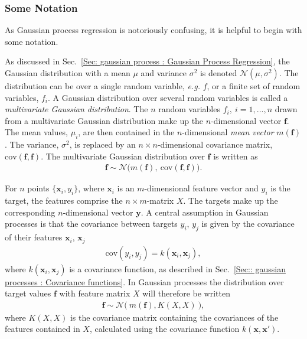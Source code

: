 \documentclass[twoside,english]{uiofysmaster}
\begin{document}
\subsubsection{Some Notation}

As Gaussian process regression is notoriously confusing, it is helpful to begin with some notation. 

As discussed in Sec.~\ref{Sec: gaussian process : Gaussian Process Regression}, the Gaussian distribution with a mean $\mu$ and variance $\sigma^2$ is denoted $\mathcal{N}(\mu, \sigma^2)$. The distribution can be over a single random variable, \textit{e.g.} $f$, or a finite set of random variables, $f_i$. A Gaussian distribution over several random variables is called a \textit{multivariate Gaussian distribution}. The $n$ random variables $f_i, ~i=1,...,n$ drawn from a multivariate Gaussian distribution make up the $n$-dimensional vector $\textbf{f}$. The mean values, $\mu_i$, are then contained in the $n$-dimensional \textit{mean vector} $m(\textbf{f})$. The variance, $\sigma^2$, is replaced by an $n \times n$-dimensional covariance matrix, $\text{cov}(\textbf{f}, \textbf{f})$. The multivariate Gaussian distribution over $\textbf{f}$ is written as
\begin{align}
\textbf{f} \sim \mathcal{N} \big(m(\textbf{f}), ~\text{cov}(\textbf{f},\textbf{f})  \big).
\end{align}  

For $n$ points $\{\textbf{x}_i , y_i\}$, where $\textbf{x}_i$ is an $m$-dimensional feature vector and $y_i$ is the target, the features comprise the $n \times m$-matrix $X$. The targets make up the corresponding $n$-dimensional vector $\textbf{y}$. A central assumption in Gaussian processes is that the covariance between targets $y_i$, $y_j$ is given by the covariance of their features $\textbf{x}_i$, $\textbf{x}_j$
\begin{align}
\text{cov}(y_i, y_j) = k(\textbf{x}_i, \textbf{x}_j),
\end{align}
where $k(\textbf{x}_i, \textbf{x}_j)$ is a covariance function, as described in Sec.~\ref{Sec:: gaussian processes : Covariance functions}. In Gaussian processes the distribution over target values $\textbf{f}$ with feature matrix $X$ will therefore be written
\begin{align}\label{Eq:: gaussian process : Normal distribution GP}
\textbf{f} \sim \mathcal{N} \big(~m( \textbf{f} ), K(X, X) ~\big),
\end{align}
where $K(X,X)$ is the covariance matrix containing the covariances of the features contained in $X$, calculated using the covariance function $k(\textbf{x}, \textbf{x}')$.
\end{document}
